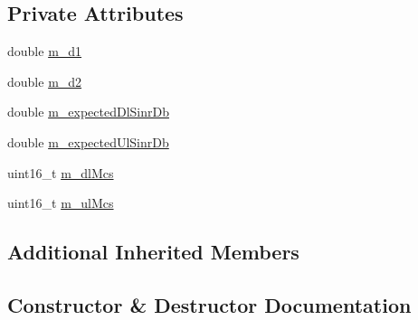 \subsection*{Private Attributes}
\begin{DoxyCompactItemize}
\item 
double \hyperlink{classLteInterferenceTestCase_aec093296b82593901f27f359c7d96149}{m\+\_\+d1}
\item 
double \hyperlink{classLteInterferenceTestCase_ab26ab336e34fbf64b30c89d2d2929ceb}{m\+\_\+d2}
\item 
double \hyperlink{classLteInterferenceTestCase_a2524e1bc84780c6e3df394e9650d9e10}{m\+\_\+expected\+Dl\+Sinr\+Db}
\item 
double \hyperlink{classLteInterferenceTestCase_a5aa9fa527027dc6d168e72f7b2b3f8a8}{m\+\_\+expected\+Ul\+Sinr\+Db}
\item 
uint16\+\_\+t \hyperlink{classLteInterferenceTestCase_a30cae7c88e7a397b7e0f5391f25d165a}{m\+\_\+dl\+Mcs}
\item 
uint16\+\_\+t \hyperlink{classLteInterferenceTestCase_ae9b735d97696042105ca16ad0bf9b6fd}{m\+\_\+ul\+Mcs}
\end{DoxyCompactItemize}
\subsection*{Additional Inherited Members}


\subsection{Constructor \& Destructor Documentation}
